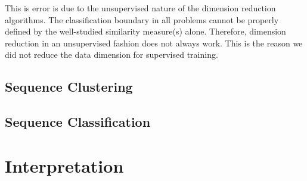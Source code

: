 \documentclass[oneside, twocolumn, a4paper, 10pt]{IEEEtran}
\begin{document}
\par
This is error is due to the unsupervised nature of the dimension reduction algorithms. The classification boundary in all problems cannot be properly defined by the well-studied similarity measure(s) alone. Therefore, dimension reduction in an unsupervised fashion does not always work. This is the reason we did not reduce the data dimension for supervised training.
\subsection{Sequence Clustering}

\subsection{Sequence Classification}
\section{Interpretation}
%
\end{document}
